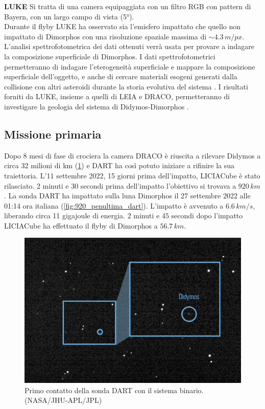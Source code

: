 \qquad \small{\textbf{LUKE}} Si tratta di una camera equipaggiata con un filtro RGB con pattern di Bayern, con un largo campo di vista (5°).\\
Durante il flyby LUKE ha osservato sia l'emisfero impattato che quello non impattato di Dimorphos con una risoluzione spaziale massima di $\sim 4.3\,m/px$. L'analisi spettrofotometrica dei dati ottenuti verrà usata per provare a indagare la composizione superficiale di Dimorphos. I dati spettrofotometrici permetteranno di indagare l'eterogeneità superficiale e mappare la composizione superficiale dell'oggetto, e anche di cercare materiali esogeni generati dalla collisione con altri asteroidi durante la storia evolutiva del sistema \citep{poggiali_expected_2022}. I risultati forniti da LUKE, insieme a quelli di LEIA e DRACO, permetteranno di investigare la geologia del sistema di Didymos-Dimorphos \citep{pajola_anticipated_2022}.

\subsection{Missione primaria}
Dopo 8 mesi di fase di crociera la camera DRACO è riuscita a rilevare Didymos a circa 32 milioni di km (\cref{fig:primo_contatto}) e DART ha così potuto iniziare a rifinire la sua traiettoria. 
L'11 settembre 2022, 15 giorni prima dell'impatto, LICIACube è stato rilasciato. 2 minuti e 30 secondi prima dell'impatto l'obiettivo si trovava a $920\,km$. La sonda DART ha impattato sulla luna Dimorphos il 27 settembre 2022 alle 01:14 ora italiana (\cref{fig:920_penultima_dart}).
L'impatto è avvenuto a $6.6\,km/s$, liberando circa 11 gigajoule di energia.
2 minuti e 45 secondi dopo l'impatto LICIACube ha effettuato il flyby di Dimorphos a $56.7\,km$.

\begin{figure}[!h]
\centering
	\includegraphics[width=.8\textwidth]{figure/primo_contatto.jpg}
\caption[Primo contatto della sonda DART con il sistema binario.]{Primo contatto della sonda DART con il sistema binario. (NASA/JHU-APL/JPL)}
\label{fig:primo_contatto}
\end{figure}

